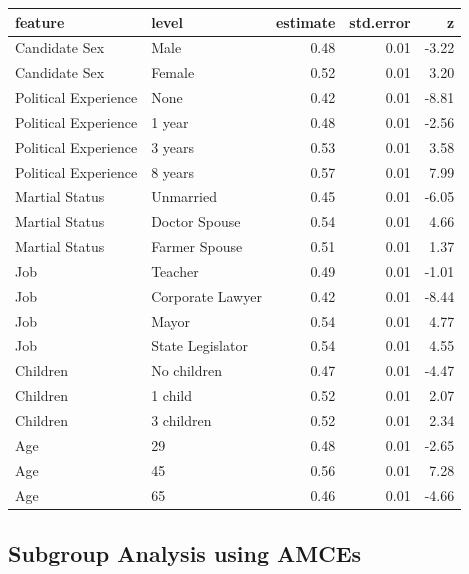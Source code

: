 \documentclass[a4paper,12pt]{article}\usepackage[]{graphicx}\usepackage[]{color}
\begin{document}
\begin{table}[ht]
\centering
\begin{tabular}{lp{1.5in}rrr}
  \hline
feature & level & estimate & std.error & z \\ 
  \hline
Candidate Sex & Male & 0.48 & 0.01 & -3.22 \\ 
  Candidate Sex & Female & 0.52 & 0.01 & 3.20 \\ 
  Political Experience & None & 0.42 & 0.01 & -8.81 \\ 
  Political Experience & 1 year & 0.48 & 0.01 & -2.56 \\ 
  Political Experience & 3 years & 0.53 & 0.01 & 3.58 \\ 
  Political Experience & 8 years & 0.57 & 0.01 & 7.99 \\ 
  Martial Status & Unmarried & 0.45 & 0.01 & -6.05 \\ 
  Martial Status & Doctor Spouse & 0.54 & 0.01 & 4.66 \\ 
  Martial Status & Farmer Spouse & 0.51 & 0.01 & 1.37 \\ 
  Job & Teacher & 0.49 & 0.01 & -1.01 \\ 
  Job & Corporate Lawyer & 0.42 & 0.01 & -8.44 \\ 
  Job & Mayor & 0.54 & 0.01 & 4.77 \\ 
  Job & State Legislator & 0.54 & 0.01 & 4.55 \\ 
  Children & No children & 0.47 & 0.01 & -4.47 \\ 
  Children & 1 child & 0.52 & 0.01 & 2.07 \\ 
  Children & 3 children & 0.52 & 0.01 & 2.34 \\ 
  Age & 29 & 0.48 & 0.01 & -2.65 \\ 
  Age & 45 & 0.56 & 0.01 & 7.28 \\ 
  Age & 65 & 0.46 & 0.01 & -4.66 \\ 
   \hline
\end{tabular}
\end{table}


\clearpage

\subsection{Subgroup Analysis using AMCEs}
\end{document}
